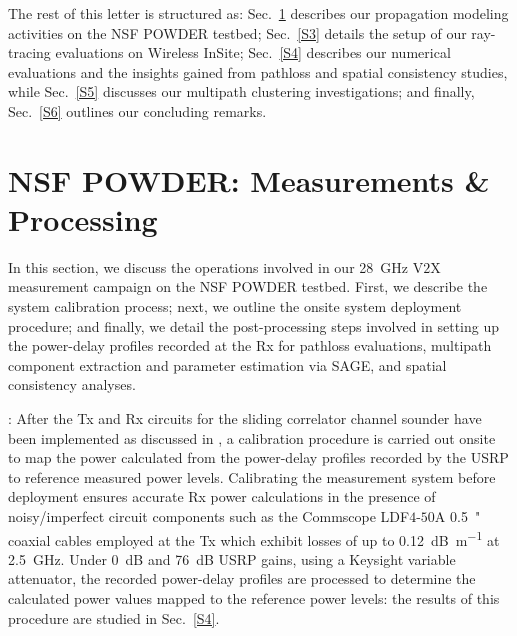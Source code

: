 \documentclass[10pt, twocolumn]{IEEEtran}
\begin{document}

The rest of this letter is structured as: Sec.~\ref{S2} describes our propagation modeling activities on the NSF POWDER testbed; Sec.~\ref{S3} details the setup of our ray-tracing evaluations on Wireless InSite; Sec.~\ref{S4} describes our numerical evaluations and the insights gained from pathloss and spatial consistency studies, while Sec.~\ref{S5} discusses our multipath clustering investigations; and finally, Sec.~\ref{S6} outlines our concluding remarks.
\vspace{-3mm}

\section{NSF POWDER: Measurements \& Processing}\label{S2}
In this section, we discuss the operations involved in our \SI{28}{\giga\hertz} V$2$X measurement campaign on the NSF POWDER testbed. First, we describe the system calibration process; next, we outline the onsite system deployment procedure; and finally, we detail the post-processing steps involved in setting up the power-delay profiles recorded at the Rx for pathloss evaluations, multipath component extraction and parameter estimation via SAGE, and spatial consistency analyses.

: After the Tx and Rx circuits for the sliding correlator channel sounder have been implemented as discussed in \cite{ICC}, a calibration procedure is carried out onsite to map the power calculated from the power-delay profiles recorded by the USRP to reference measured power levels. Calibrating the measurement system before deployment ensures accurate Rx power calculations in the presence of noisy/imperfect circuit components such as the Commscope LDF$4$-$50$A \SI{0.5}{{"}} coaxial cables employed at the Tx which exhibit losses of up to \SI{0.12}{\deci\bel\per\meter} at \SI{2.5}{\giga\hertz}. Under \SI{0}{\deci\bel} and \SI{76}{\deci\bel} USRP gains, using a Keysight variable attenuator, the recorded power-delay profiles are processed to determine the calculated power values mapped to the reference power levels: the results of this procedure are studied in Sec.~\ref{S4}.
\end{document}
